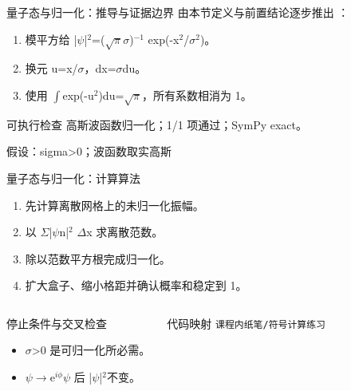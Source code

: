 \begin{frame}[t]{量子态与归一化：推导与证据边界}
\footnotesize
{}\quad 由本节定义与前置结论逐步推出 ：
\begin{enumerate}
\item 模平方给 |\ensuremath{\psi}|\ensuremath{^{2}}=(\ensuremath{\sqrt{\pi}}\ensuremath{\sigma})\ensuremath{^{-1}} exp(-x\ensuremath{^{2}}/\allowbreak{}\ensuremath{\sigma}\ensuremath{^{2}})。
\item 换元 u=x/\allowbreak{}\ensuremath{\sigma}，dx=\ensuremath{\sigma}du。
\item 使用 \ensuremath{\int}exp(-u\ensuremath{^{2}})du=\ensuremath{\sqrt{\pi}}，所有系数相消为 1。
\end{enumerate}\begin{block}{可执行检查}
\quad 高斯波函数归一化；1/1 项通过；SymPy exact。
\par\scriptsize 假设：sigma>0；波函数取实高斯
\end{block}
\end{frame}

\begin{frame}[t]{量子态与归一化：计算算法}
\footnotesize
{}\begin{enumerate}
\item 先计算离散网格上的未归一化振幅。
\item 以 \ensuremath{\Sigma}|\ensuremath{\psi}n|\ensuremath{^{2}} \ensuremath{\Delta}x 求离散范数。
\item 除以范数平方根完成归一化。
\item 扩大盒子、缩小格距并确认概率和稳定到 1。
\end{enumerate}\begin{columns}[T,onlytextwidth]
\begin{block}{停止条件与交叉检查}\scriptsize\begin{itemize}
\item[\CheckMark] \ensuremath{\sigma}>0 是可归一化所必需。
\item[\CheckMark] \ensuremath{\psi}\ensuremath{\rightarrow}e\ensuremath{^{i\phi}}\ensuremath{\psi} 后 |\ensuremath{\psi}|\ensuremath{^{2}}不变。
\end{itemize}\end{block}
\begin{block}{代码映射}
\scriptsize \texttt{课程内纸笔/\allowbreak{}符号计算练习}
\end{block}\end{columns}\end{frame}

